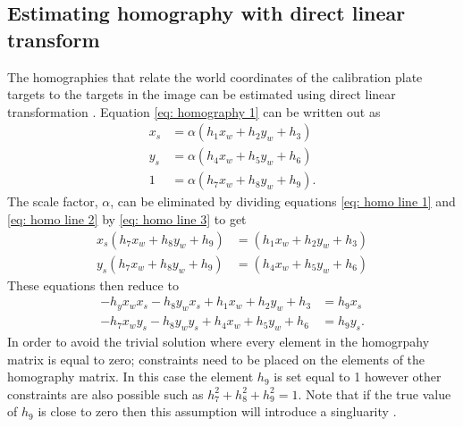 \subsection{Estimating homography with direct linear transform}
The homographies that relate the world coordinates of the calibration plate targets to the targets in the image can be estimated using direct linear transformation \cite{zhangtut}. Equation \ref{eq: homography 1} can be written out as
\begin{align}
	x_s &= \alpha \left( h_1 x_w + h_2 y_w + h_3 \right) \label{eq: homo line 1} \\
	y_s &= \alpha \left( h_4 x_w + h_5 y_w + h_6 \right) \label{eq: homo line 2} \\
	1 &= \alpha \left( h_7 x_w + h_8 y_w + h_9 \right) \label{eq: homo line 3}.
\end{align}
The scale factor, $\alpha$, can be eliminated by dividing equations \ref{eq: homo line 1} and \ref{eq: homo line 2} by \ref{eq: homo line 3} to get
\begin{align}
	x_s \left( h_7 x_w + h_8 y_w + h_9 \right) &= \left( h_1 x_w + h_2 y_w + h_3 \right) \\
	y_s \left( h_7 x_w + h_8 y_w + h_9 \right) &= \left( h_4 x_w + h_5 y_w + h_6 \right)
\end{align}
These equations then reduce to
\begin{align}
	- h_y x_w x_s - h_8 y_w x_s + h_1 x_w + h_2 y_w +h_3 &= h_9 x_s \label{eq: solve homo 1}\\
	- h_7 x_w y_s - h_8 y_w y_s + h_4 x_w + h_5 y_w + h_6 &= h_9 y_s. \label{eq: solve homo 2}
\end{align}
In order to avoid the trivial solution where every element in the homogrpahy matrix is equal to zero; constraints need to be placed on the elements of the homography matrix. In this case the element $h_9$ is set equal to 1 however other constraints are also possible such as $h_7^2 + h_8^2 + h_9^2 = 1$. Note that if the true value of $h_9$ is close to zero then this assumption will introduce a singluarity \cite{emerging}.

